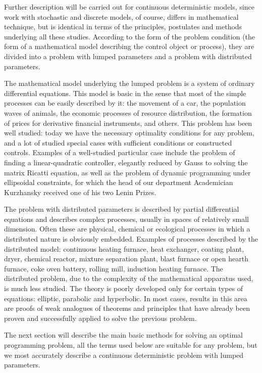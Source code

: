     Further description will be carried out for continuous deterministic models, since work with stochastic and discrete models, of course, differs in mathematical technique, but is identical in terms of the principles, postulates and methods underlying all these studies.
    According to the form of the problem condition (the form of a mathematical model describing the control object or process), they are divided into a problem with lumped parameters and a problem with distributed parameters.
    
    The mathematical model underlying the lumped problem is a system of ordinary differential equations.
    This model is basic in the sense that most of the simple processes can be easily described by it: the movement of a car, the population waves of animals, the economic processes of resource distribution, the formation of prices for derivative financial instruments, and others.
    This problem has been well studied: today we have the necessary optimality conditions for any problem, and a lot of studied special cases with sufficient conditions or constructed controls.
    Examples of a well-studied particular case include the problem of finding a linear-quadratic controller, elegantly reduced by Gauss to solving the matrix Ricatti equation, as well as the problem of dynamic programming under ellipsoidal constraints, for which the head of our department Academician Kurzhansky received one of his two Lenin Prizes.

    The problem with distributed parameters is described by partial differential equations and describes complex processes, usually in spaces of relatively small dimension.
    Often these are physical, chemical or ecological processes in which a distributed nature is obviously embedded.
    Examples of processes described by the distributed model: continuous heating furnace, heat exchanger, coating plant, dryer, chemical reactor, mixture separation plant, blast furnace or open hearth furnace, coke oven battery, rolling mill, induction heating furnace.
    The distributed problem, due to the complexity of the mathematical apparatus used, is much less studied.
    The theory is poorly developed only for certain types of equations: elliptic, parabolic and hyperbolic.
    In most cases, results in this area are proofs of weak analogues of theorems and principles that have already been proven and successfully applied to solve the previous problem. 

    The next section will describe the main basic methods for solving an optimal programming problem, all the terms used below are suitable for any problem, but we most accurately describe a continuous deterministic problem with lumped parameters.

